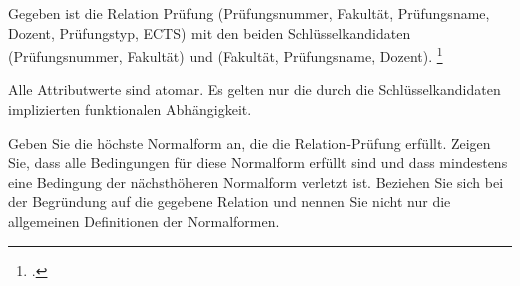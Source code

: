 \documentclass{bschlangaul-aufgabe}
\begin{document}

\let\FA=\liFunktionaleAbhaengigkeiten
\let\t=\texttt

Gegeben ist die Relation Prüfung (Prüfungsnummer, Fakultät,
Prüfungsname, Dozent, Prüfungstyp, ECTS) mit den beiden
Schlüsselkandidaten (Prüfungsnummer, Fakultät) und (Fakultät,
Prüfungsname, Dozent).
\footcite{examen:66116:2021:03}



Alle Attributwerte sind atomar. Es gelten nur die durch die
Schlüsselkandidaten implizierten funktionalen Abhängigkeit.

Geben Sie die höchste Normalform an, die die Relation-Prüfung erfüllt.
Zeigen Sie, dass alle Bedingungen für diese Normalform erfüllt sind
und dass mindestens eine Bedingung der nächsthöheren Normalform verletzt
ist. Beziehen Sie sich bei der Begründung auf die gegebene Relation und
nennen Sie nicht nur die allgemeinen Definitionen der Normalformen.
\end{document}
